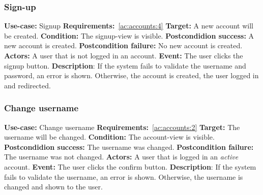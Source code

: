 \subsubsection{Sign-up}\label{subsubsec:signup}
\textbf{Use-case:} Signup \newline
\textbf{Requirements:}~\ref{ac:accounts:4} \newline
\textbf{Target:} A new account will be created. \newline
\textbf{Condition:} The signup-view is visible. \newline
\textbf{Postcondidion success:} A new account is created. \newline
\textbf{Postcondition failure:} No new account is created. \newline
\textbf{Actors:} A user that is not logged in an account. \newline
\textbf{Event:} The user clicks the signup button. \newline
\textbf{Description}: If the system fails to validate the username and password, an error is shown.
Otherwise, the account is created, the user logged in and redirected.

\subsubsection{Change username}\label{subsubsec:change-username}
\textbf{Use-case:} Change username \newline
\textbf{Requirements:}~\ref{ac:accounts:2} \newline
\textbf{Target:} The username will be changed. \newline
\textbf{Condition:} The account-view is visible. \newline
\textbf{Postcondidion success:} The username was changed. \newline
\textbf{Postcondition failure:} The username was not changed. \newline
\textbf{Actors:} A user that is logged in an \textit{active} account. \newline
\textbf{Event:} The user clicks the confirm button. \newline
\textbf{Description}: If the system fails to validate the username, an error is shown.
Otherwise, the username is changed and shown to the user.

